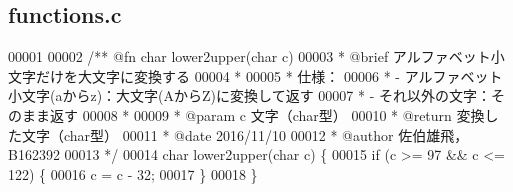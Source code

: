 \subsection{functions.\-c}

\begin{DoxyCode}
00001 \textcolor{comment}{}
00002 \textcolor{comment}{/** @fn char lower2upper(char c)}
00003 \textcolor{comment}{ *  @brief  アルファベット小文字だけを大文字に変換する}
00004 \textcolor{comment}{ *}
00005 \textcolor{comment}{ *  仕様：}
00006 \textcolor{comment}{ *  - アルファベット小文字(aからz)：大文字(AからZ)に変換して返す}
00007 \textcolor{comment}{ *  - それ以外の文字：そのまま返す}
00008 \textcolor{comment}{ *}
00009 \textcolor{comment}{ *  @param  c 文字（char型）}
00010 \textcolor{comment}{ *  @return 変換した文字（char型）}
00011 \textcolor{comment}{ *  @date   2016/11/10}
00012 \textcolor{comment}{ *  @author 佐伯雄飛，B162392}
00013 \textcolor{comment}{ */}
00014 \textcolor{keywordtype}{char} lower2upper(\textcolor{keywordtype}{char} c) \{
00015   \textcolor{keywordflow}{if} (c >= 97 && c <= 122) \{
00016     c = c - 32;
00017   \}
00018 \}
\end{DoxyCode}
